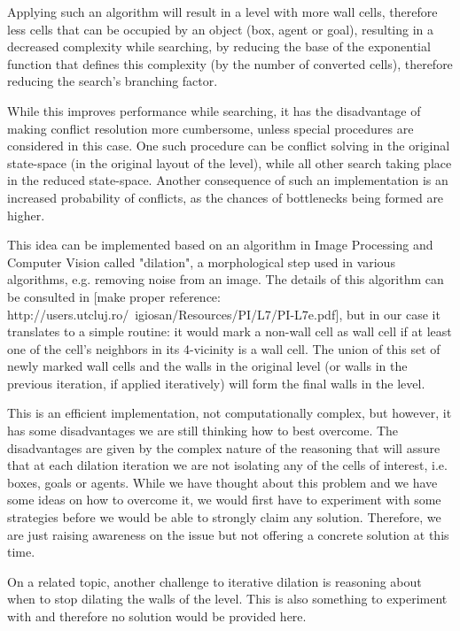 \documentclass[letterpaper]{article}
\begin{document}
Applying such an algorithm will result in a level with more wall cells, therefore less cells that can be occupied by an object (box, agent or goal), resulting in a decreased complexity while searching, by reducing the base of the exponential function that defines this complexity (by the number of converted cells), therefore reducing the search's branching factor.

While this improves performance while searching, it has the disadvantage of making conflict resolution more cumbersome, unless special procedures are considered in this case. One such procedure can be conflict solving in the original state-space (in the original layout of the level), while all other search taking place in the reduced state-space. Another consequence of such an implementation is an increased probability of conflicts, as the chances of bottlenecks being formed are higher.

This idea can be implemented based on an algorithm in Image Processing and Computer Vision called "dilation", a morphological step used in various algorithms, e.g. removing noise from an image. The details of this algorithm can be consulted in [make proper reference: http://users.utcluj.ro/~igiosan/Resources/PI/L7/PI-L7e.pdf], but in our case it translates to a simple routine: it would mark a non-wall cell as wall cell if at least one of the cell's neighbors in its 4-vicinity is a wall cell. The union of this set of newly marked wall cells and the walls in the original level (or walls in the previous iteration, if applied iteratively) will form the final walls in the level.

This is an efficient implementation, not computationally complex, but however, it has some disadvantages we are still thinking how to best overcome. The disadvantages are given by the complex nature of the reasoning that will assure that at each dilation iteration we are not isolating any of the cells of interest, i.e. boxes, goals or agents. While we have thought about this problem and we have some ideas on how to overcome it, we would first have to experiment with some strategies before we would be able to strongly claim any solution. Therefore, we are just raising awareness on the issue but not offering a concrete solution at this time.

On a related topic, another challenge to iterative dilation is reasoning about when to stop dilating the walls of the level. This is also something to experiment with and therefore no solution would be provided here.
\end{document}
